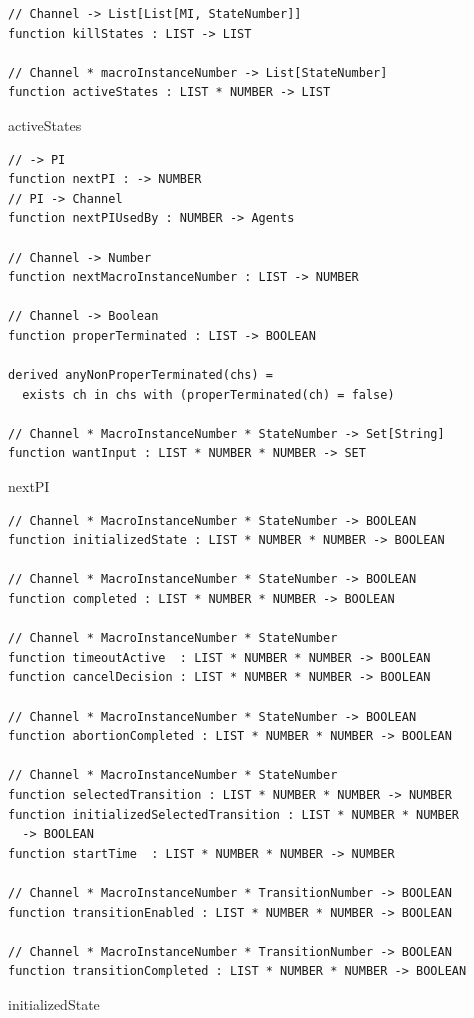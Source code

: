 \begin{listing}[H]
\begin{verbatim}
// Channel -> List[List[MI, StateNumber]]
function killStates : LIST -> LIST

// Channel * macroInstanceNumber -> List[StateNumber]
function activeStates : LIST * NUMBER -> LIST
\end{verbatim}
\caption{activeStates}
\label{lst:asm:activeStates}
\end{listing}


\begin{listing}[H]
\begin{verbatim}
// -> PI
function nextPI : -> NUMBER
// PI -> Channel
function nextPIUsedBy : NUMBER -> Agents

// Channel -> Number
function nextMacroInstanceNumber : LIST -> NUMBER

// Channel -> Boolean
function properTerminated : LIST -> BOOLEAN

derived anyNonProperTerminated(chs) =
  exists ch in chs with (properTerminated(ch) = false)

// Channel * MacroInstanceNumber * StateNumber -> Set[String]
function wantInput : LIST * NUMBER * NUMBER -> SET
\end{verbatim}
\caption{nextPI}
\label{lst:asm:nextPI}
\end{listing}



\begin{listing}[H]
\begin{verbatim}
// Channel * MacroInstanceNumber * StateNumber -> BOOLEAN
function initializedState : LIST * NUMBER * NUMBER -> BOOLEAN

// Channel * MacroInstanceNumber * StateNumber -> BOOLEAN
function completed : LIST * NUMBER * NUMBER -> BOOLEAN

// Channel * MacroInstanceNumber * StateNumber
function timeoutActive  : LIST * NUMBER * NUMBER -> BOOLEAN
function cancelDecision : LIST * NUMBER * NUMBER -> BOOLEAN

// Channel * MacroInstanceNumber * StateNumber -> BOOLEAN
function abortionCompleted : LIST * NUMBER * NUMBER -> BOOLEAN

// Channel * MacroInstanceNumber * StateNumber
function selectedTransition : LIST * NUMBER * NUMBER -> NUMBER
function initializedSelectedTransition : LIST * NUMBER * NUMBER
  -> BOOLEAN
function startTime  : LIST * NUMBER * NUMBER -> NUMBER

// Channel * MacroInstanceNumber * TransitionNumber -> BOOLEAN
function transitionEnabled : LIST * NUMBER * NUMBER -> BOOLEAN

// Channel * MacroInstanceNumber * TransitionNumber -> BOOLEAN
function transitionCompleted : LIST * NUMBER * NUMBER -> BOOLEAN
\end{verbatim}
\caption{initializedState}
\label{lst:asm:initializedState}
\end{listing}




